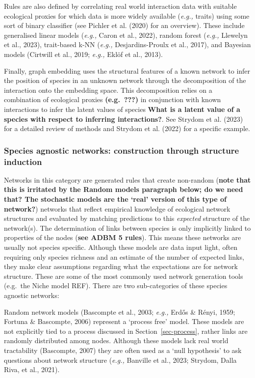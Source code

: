 \documentclass[
]{article}
\begin{document}
Rules are also defined by correlating real world interaction data with
suitable ecological proxies for which data is more widely available
(\emph{e.g.,} traits) using some sort of binary classifier (see Pichler
et al. (2020) for an overview). These include generalised linear models
(\emph{e.g.,} Caron et al., 2022), random forest (\emph{e.g.,} Llewelyn
et al., 2023), trait-based k-NN (\emph{e.g.,} Desjardins-Proulx et al.,
2017), and Bayesian models (Cirtwill et al., 2019; \emph{e.g.,} Eklöf et
al., 2013).

Finally, graph embedding uses the structural features of a known network
to infer the position of species in an unknown network through the
decomposition of the interaction onto the embedding space. This
decomposition relies on a combination of ecological proxies
\textbf{(e.g.~???)} in conjunction with known interactions to infer the
latent values of species \textbf{What is a latent value of a species
with respect to inferring interactions?}. See Strydom et al. (2023) for
a detailed review of methods and Strydom et al. (2022) for a specific
example.

\subsubsection{Species agnostic networks: construction through structure
induction}\label{species-agnostic-networks-construction-through-structure-induction}

Networks in this category are generated rules that create non-random
(\textbf{note that this is irritated by the Random models paragraph
below; do we need that? The stochastic models are the `real' version of
this type of network?}) networks that reflect empirical knowledge of
ecological network structures and evaluated by matching predictions to
this \emph{expected} structure of the network(s). The determination of
links between species is only implicitly linked to properties of the
nodes (\textbf{see ADBM 5 rules}). This means these networks are usually
not species specific. Although these models are data input light, often
requiring only species richness and an estimate of the number of
expected links, they make clear assumptions regarding what the
expectations are for network structure. These are some of the most
commonly used network generation tools (e.g.~the Niche model REF). There
are two sub-categories of these species agnostic networks:

Random network models (Bascompte et al., 2003; \emph{e.g.,} Erdős \&
Rényi, 1959; Fortuna \& Bascompte, 2006) represent a `process free'
model. These models are not explicitly tied to a process discussed in
Section~\ref{sec-process}, rather links are randomly distributed among
nodes. Although these models lack real world tractability (Bascompte,
2007) they are often used as a `null hypothesis' to ask questions about
network structure (\emph{e.g.,} Banville et al., 2023; Strydom, Dalla
Riva, et al., 2021).
\end{document}
